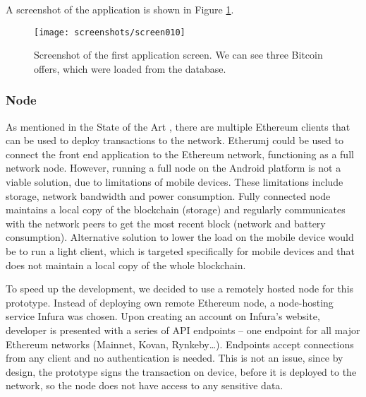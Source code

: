 A screenshot of the application is shown in Figure \ref{fig:app-screenshot}.

\begin{figure}[ht]
    \centering
    \texttt{[image: screenshots/screen010]}
    \caption{Screenshot of the first application screen. We can see three Bitcoin offers, which were loaded from the database.}
    \label{fig:app-screenshot}
\end{figure}
% 
% 
% 
% 
\subsubsection{Node}
As mentioned in the State of the Art \pageref{sec:eth-clients}, there are multiple Ethereum clients that can be used to deploy transactions to the network. Etherumj could be used to connect the front end application to the Ethereum network, functioning as a full network node. However, running a full node on the Android platform is not a viable solution, due to limitations of mobile devices. These limitations include storage, network bandwidth and power consumption\footnotemark.%
% 
Fully connected node maintains a local copy of the blockchain (storage) and regularly communicates with the network peers to get the most recent block (network and battery consumption). Alternative solution to lower the load on the mobile device would be to run a light client\footnotemark, which is targeted specifically for mobile devices and that does not maintain a local copy of the whole blockchain.
% 

To speed up the development, we decided to use a remotely hosted node for this prototype. Instead of deploying own remote Ethereum node, a node-hosting service Infura was chosen. Upon creating an account on Infura’s website, developer is presented with a series of API endpoints – one endpoint for all major Ethereum networks (Mainnet, Kovan, Rynkeby…). Endpoints accept connections from any client and no authentication is needed. This is not an issue, since by design, the prototype signs the transaction on device, before it is deployed to the network, so the node does not have access to any sensitive data.

